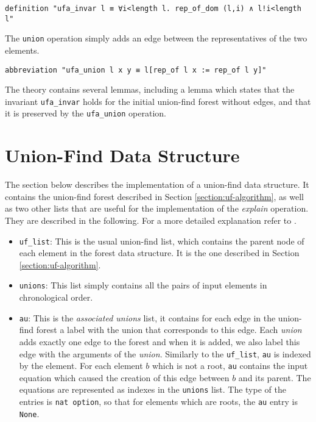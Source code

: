 \begin{lstlisting}
definition "ufa_invar l ≡ ∀i<length l. rep_of_dom (l,i) ∧ l!i<length l"
\end{lstlisting}

The \lstinline{union} operation simply adds an edge between the representatives of the two elements.

\begin{lstlisting}
abbreviation "ufa_union l x y ≡ l[rep_of l x := rep_of l y]"
\end{lstlisting}

The theory contains several lemmas, including a lemma which states that the invariant \lstinline{ufa_invar} holds for the initial union-find forest without edges, and that it is preserved by the \lstinline{ufa_union} operation.

\section{Union-Find Data Structure}
\label{section:uf-data}

The section below describes the implementation of a union-find data structure.
It contains the union-find forest described in Section \ref{section:uf-algorithm}, as well as two other lists that are useful for the implementation of the \emph{explain} operation. They are described in the following. For a more detailed explanation refer to \cite{Nieuwenhuis}.

\begin{itemize}
	\item \lstinline{uf_list}: This is the usual union-find list, which contains the parent node of each element in the forest data structure. It is the one described in Section \ref{section:uf-algorithm}.

	\item \lstinline{unions}: This list simply contains all the pairs of input elements in chronological order.

	\item \lstinline{au}: This is the \emph{associated unions} list, it contains for each edge in the union-find forest a label with the union that corresponds to this edge. Each \emph{union} adds exactly one edge to the forest and when it is added, we also label this edge with the arguments of the \emph{union}. Similarly to the \lstinline{uf_list}, \lstinline|au| is indexed by the element. For each element $b$ which is not a root, \lstinline{au} contains the input equation which caused the creation of this edge between $b$ and its parent. The equations are represented as indexes in the \lstinline{unions} list. The type of the entries is \lstinline{nat option}, so that for elements which are roots, the \lstinline{au} entry is \lstinline{None}.
\end{itemize}

